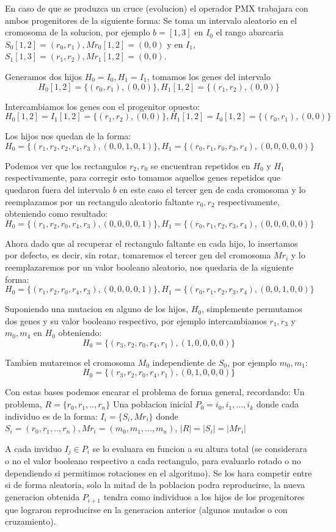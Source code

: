 \documentclass[10pt]{article}
\begin{document}
En caso de que se produzca un cruce (evolucion) el operador PMX trabajara con ambos progenitores de la siguiente forma: 
Se toma un intervalo aleatorio en el cromosoma de la solucion, por ejemplo $b = [1,3]$ en $I_0$ el rango abarcaria $S_0[1,2] = (r_0,r_1), Mr_0[1,2] = (0,0)$ y en $I_1$, $S_1[1,3] = (r_1,r_2), Mr_1[1,2] = (0,0)$.

Generamos dos hijos $H_0 = I_0, H_1 = I_1$, tomamos los genes del intervalo
$$H_0[1,2] = \{(r_0,r_1),(0,0)\}, H_1[1,2] = \{(r_1,r_2),(0,0)\}$$

Intercambiamos los genes con el progenitor opuesto:
$$H_0[1,2] = I_1[1,2] = \{(r_1,r_2),(0,0)\}, H_1[1,2] = I_0[1,2] = \{(r_0,r_1),(0,0)\}$$ 

Los hijos nos quedan de la forma: 
$$H_0=\{(r_1,r_2,r_2,r_4,r_3),(0,0,1,0,1)\}, H_1 = \{(r_0,r_1,r_0,r_3,r_4),(0,0,0,0,0)\}$$

Podemos ver que los rectangulos $r_2, r_0$ se encuentran repetidos en $H_0$ y $H_1$ respectivamente, para corregir esto tomamos aquellos genes repetidos que quedaron fuera del intervalo $b$ en este caso el tercer gen de cada cromosoma y lo reemplazamos por un rectangulo aleatorio faltante $r_0, r_2$ respectivamente, obteniendo como resultado:
$$H_0=\{(r_1,r_2,r_0,r_4,r_3),(0,0,0,0,1)\}, H_1 = \{(r_0,r_1,r_2,r_3,r_4),(0,0,0,0,0)\}$$

Ahora dado que al recuperar el rectangulo faltante en cada hijo, lo insertamos por defecto, es decir, sin rotar, tomaremos el tercer gen del cromosoma $Mr_i$ y lo reemplazaremos por un valor booleano aleatorio, nos quedaria de la siguiente forma:
$$H_0=\{(r_1,r_2,r_0,r_4,r_3),(0,0,0,0,1)\}, H_1 = \{(r_0,r_1,r_2,r_3,r_4),(0,0,1,0,0)\}$$

Suponiendo una mutacion en alguno de los hijos, $H_0$, simplemente permutamos dos genes y su valor booleano respectivo, por ejemplo intercambiamos $r_1,r_3$ y $m_0,m_4$ en $H_0$ obteniendo:
$$H_0=\{(r_3,r_2,r_0,r_4,r_1),(1,0,0,0,0)\}$$

Tambien mutaremos el cromosoma $M_0$ independiente de $S_0$, por ejemplo $m_0,m_1$:
$$H_0=\{(r_3,r_2,r_0,r_4,r_1),(0,1,0,0,0)\}$$

Con estas bases podemos encarar el problema de forma general, recordando: 
Un problema, $R = \{r_0,r_1,..,r_n\}$
Una poblacion inicial $P_0={i_0,i_1,...,i_k}$ donde cada individuo es de la forma:
$I_i = \{S_i,Mr_i\}$ donde $S_i = (r_0,r_1,..,r_n), Mr_i = (m_0, m_1,...,m_n)$, $|R| = |S_i| = |Mr_i|$

A cada inviduo $I_j \in P_i$ se lo evaluara en funcion a su altura total (se considerara o no el valor booleano respectivo a cada rectangulo, para evaluarlo rotado o no dependiendo si permitimos rotaciones en el algoritmo). Se los hara competir entre si de forma aleatoria, solo la mitad de la poblacion podra reproducirse, la nueva generacion obtenida $P_{i+1}$ tendra como individuos a los hijos de los progenitores que lograron reproducirse en la generacion anterior (algunos mutados o con cruzamiento). 
\end{document}
